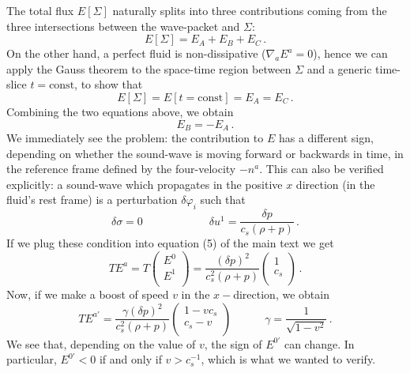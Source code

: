 \documentclass[aps,prl,reprint,nofootinbib]{revtex4-1}
\newcommand{\spc}{\quad \quad \quad}
\begin{document}
The total flux $E[\Sigma]$ naturally splits into three contributions coming from the three intersections between the wave-packet and $\Sigma$:
\begin{equation}
E[\Sigma]= E_A +E_B +E_C \, .
\end{equation} 
On the other hand, a perfect fluid is non-dissipative ($\nabla_a E^a =0$), hence we can apply the Gauss theorem to the space-time region between $\Sigma$ and a generic time-slice $t=\text{const}$, to show that
\begin{equation}
E[\Sigma] =E[t=\text{const}]= E_A = E_C \, .
\end{equation}
Combining the two equations above, we obtain
\begin{equation}\label{eunz}
E_B =-E_A \, .
\end{equation}
We immediately see the problem: the contribution to $E$ has a  different sign, depending on whether the sound-wave is moving forward or backwards in time, in the reference frame defined by the four-velocity $-n^a$. This can also be verified explicitly: a sound-wave which propagates in the positive $x$ direction (in the fluid's rest frame) is a perturbation $\delta \varphi_i$ such that
\begin{equation}
\delta \sigma = 0 \spc \spc \delta u^1 = \dfrac{\delta p}{c_s (\rho +p)} \, .
\end{equation}
If we plug these condition into equation (5) of the main text we get
\begin{equation}
TE^a = T
\begin{pmatrix}
E^0   \\
E^1 \\
\end{pmatrix}
= \dfrac{(\delta p)^2}{c_s^2(\rho+p)}
\begin{pmatrix}
1   \\
c_s \\
\end{pmatrix} \, .
\end{equation}
Now, if we make a boost of speed $v$ in the $x-$direction, we obtain
\begin{equation}
TE^{a'}  = \dfrac{\gamma(\delta p)^2}{c_s^2(\rho+p)}
\begin{pmatrix}
1-vc_s   \\
c_s -v \\
\end{pmatrix} 
\spc \gamma = \dfrac{1}{\sqrt{1-v^2}} \, .
\end{equation} 
We see that, depending on the value of $v$, the sign of $E^{0'}$ can change. In particular, $E^{0'} < 0$ if and only if $v>c_s^{-1}$, which is what we wanted to verify.
\end{document}
